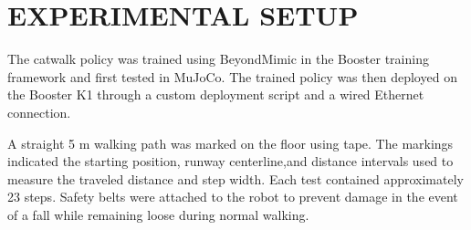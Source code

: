 \section{EXPERIMENTAL SETUP}

The catwalk policy was trained using BeyondMimic in the Booster training framework and first tested in MuJoCo. The trained policy was then deployed on the Booster K1 through a custom deployment script and a wired Ethernet connection.

A straight 5 m walking path was marked on the floor using tape. The markings indicated the starting position, runway centerline,and distance intervals used to measure the traveled distance and step width. Each test contained approximately 23 steps. Safety belts were attached to the robot to prevent damage in the event of a fall while remaining loose during normal walking.

